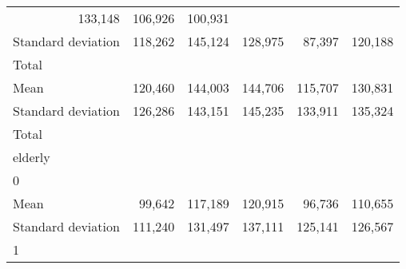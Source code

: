 \begin{tabular}{llllll}
  \multicolumn{1}{r}{133,148} &
  \multicolumn{1}{r}{106,926} &
  \multicolumn{1}{r}{100,931} \\
\multicolumn{1}{l}{\hspace{4em}Standard deviation} &
  \multicolumn{1}{|r}{118,262} &
  \multicolumn{1}{r}{145,124} &
  \multicolumn{1}{r}{128,975} &
  \multicolumn{1}{r}{87,397} &
  \multicolumn{1}{r}{120,188} \\
\multicolumn{1}{l}{\hspace{3em}Total} &
  \multicolumn{1}{|r}{} &
  \multicolumn{1}{r}{} &
  \multicolumn{1}{r}{} &
  \multicolumn{1}{r}{} &
  \multicolumn{1}{r}{} \\
\multicolumn{1}{l}{\hspace{4em}Mean} &
  \multicolumn{1}{|r}{120,460} &
  \multicolumn{1}{r}{144,003} &
  \multicolumn{1}{r}{144,706} &
  \multicolumn{1}{r}{115,707} &
  \multicolumn{1}{r}{130,831} \\
\multicolumn{1}{l}{\hspace{4em}Standard deviation} &
  \multicolumn{1}{|r}{126,286} &
  \multicolumn{1}{r}{143,151} &
  \multicolumn{1}{r}{145,235} &
  \multicolumn{1}{r}{133,911} &
  \multicolumn{1}{r}{135,324} \\
\multicolumn{1}{l}{\hspace{1em}Total} &
  \multicolumn{1}{|r}{} &
  \multicolumn{1}{r}{} &
  \multicolumn{1}{r}{} &
  \multicolumn{1}{r}{} &
  \multicolumn{1}{r}{} \\
\multicolumn{1}{l}{\hspace{2em}elderly} &
  \multicolumn{1}{|r}{} &
  \multicolumn{1}{r}{} &
  \multicolumn{1}{r}{} &
  \multicolumn{1}{r}{} &
  \multicolumn{1}{r}{} \\
\multicolumn{1}{l}{\hspace{3em}0} &
  \multicolumn{1}{|r}{} &
  \multicolumn{1}{r}{} &
  \multicolumn{1}{r}{} &
  \multicolumn{1}{r}{} &
  \multicolumn{1}{r}{} \\
\multicolumn{1}{l}{\hspace{4em}Mean} &
  \multicolumn{1}{|r}{99,642} &
  \multicolumn{1}{r}{117,189} &
  \multicolumn{1}{r}{120,915} &
  \multicolumn{1}{r}{96,736} &
  \multicolumn{1}{r}{110,655} \\
\multicolumn{1}{l}{\hspace{4em}Standard deviation} &
  \multicolumn{1}{|r}{111,240} &
  \multicolumn{1}{r}{131,497} &
  \multicolumn{1}{r}{137,111} &
  \multicolumn{1}{r}{125,141} &
  \multicolumn{1}{r}{126,567} \\
\multicolumn{1}{l}{\hspace{3em}1} &

\end{tabular}
